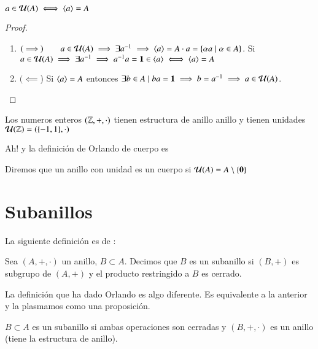 \begin{pro}
	$a \in \mathcal{U}(A) \iff \langle a\rangle = A$
\end{pro}

\begin{proof}$ $\newline
	\begin{enumerate}
		\item $(\implies)\qquad a \in \mathcal{U}(A) \implies \exists a^{-1} \implies \langle a\rangle = A\cdot a = \{\alpha a \mid \alpha \in A\}$. Si $a \in \mathcal{U}(A) \implies \exists a^{-1} \implies a^{-1}a = \mathbf{1} \in \langle a\rangle \iff \langle a\rangle = A$
		
		\item $(\impliedby$) Si $\langle a\rangle = A$ entonces $\exists b \in A \mid ba = \mathbf{1} \implies b = a^{-1} \implies a \in \mathcal{U}(A)$.
	\end{enumerate}
\end{proof}

\begin{ej}
	Los numeros enteros $(\mathbb{Z}, +, \cdot)$ tienen estructura de anillo anillo y tienen unidades $\mathcal{U}(\mathbb{Z}) = (\{-1, 1\}, \cdot)$
\end{ej}

Ah! y la definición de Orlando de cuerpo es

\begin{dfn}[Cuerpo]
	\label{dfn:cuerporlando}
	Diremos que un anillo con unidad es un cuerpo si $\mathcal{U}(A) = A \setminus \{\mathbf{0}\}$
\end{dfn}

\section{Subanillos}

La siguiente definición es de \cite{dor96}:

\begin{dfn}[Subanillo]
	Sea $(A, +, \cdot)$ un anillo, $B\subset A$. Decimos que $B$ es un subanillo si $(B, +)$ es subgrupo de  $(A, +)$ y el producto restringido a $B$ es cerrado.
\end{dfn}

La definición que ha dado Orlando es algo diferente. Es equivalente a la anterior y la plasmamos como una proposición.

\begin{pro}
	$B \subset A$ es un subanillo si ambas operaciones son cerradas y $(B, +, \cdot)$ es un anillo (tiene la estructura de anillo).
\end{pro}

